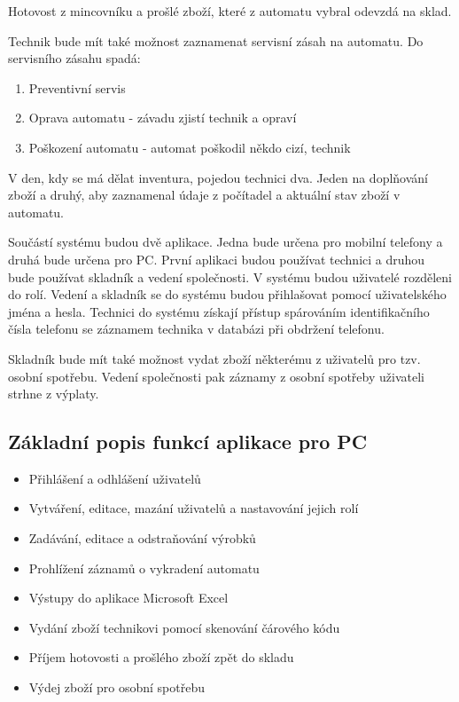\documentclass[a4paper,10pt]{article}
\begin{document}
Hotovost z mincovníku a prošlé zboží, které z automatu vybral odevzdá na sklad.

Technik bude mít také možnost zaznamenat servisní zásah na automatu. Do servisního zásahu spadá:
\begin{enumerate}
	\item Preventivní servis
	\item Oprava automatu - závadu zjistí technik a opraví
	\item Poškození automatu - automat poškodil někdo cizí, technik
\end{enumerate}

V den, kdy se má dělat inventura, pojedou technici dva. Jeden na doplňování zboží a druhý, aby zaznamenal údaje z počítadel a aktuální stav zboží v automatu.

Součástí systému budou dvě aplikace. Jedna bude určena pro mobilní telefony a druhá bude určena pro PC. První aplikaci budou používat technici a druhou bude používat skladník a vedení společnosti. V systému budou uživatelé rozděleni do rolí. Vedení a skladník se do systému budou přihlašovat pomocí uživatelského jména a hesla. Technici do systému získají přístup spárováním identifikačního čísla telefonu se záznamem technika v databázi při obdržení telefonu.

Skladník bude mít také možnost vydat zboží některému z uživatelů pro tzv. osobní spotřebu. Vedení společnosti pak záznamy z osobní spotřeby uživateli strhne z výplaty.

\subsection{Základní popis funkcí aplikace pro PC}
\begin{itemize}
  \item Přihlášení a odhlášení uživatelů
  \item Vytváření, editace, mazání uživatelů a nastavování jejich rolí
  \item Zadávání, editace a odstraňování výrobků
  \item Prohlížení záznamů o vykradení automatu
  \item Výstupy do aplikace Microsoft Excel
  \item Vydání zboží technikovi pomocí skenování čárového kódu
  \item Příjem hotovosti a prošlého zboží zpět do skladu
  \item Výdej zboží pro osobní spotřebu
\end{itemize}
\end{document}
